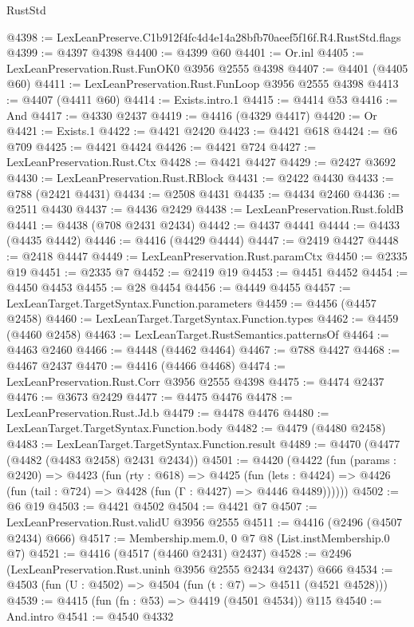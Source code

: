 \begin{lexlean}{RustStd}
\begin{coremodule}
@4398 := LexLeanPreserve.C1b912f4fc4d4e14a28bfb70aeef5f16f.R4.RustStd.flags
@4399 := @4397 @4398
@4400 := @4399 @60
@4401 := Or.inl
@4405 := LexLeanPreservation.Rust.FunOK0 @3956 @2555 @4398
@4407 := @4401 (@4405 @60)
@4411 := LexLeanPreservation.Rust.FunLoop @3956 @2555 @4398
@4413 := @4407 (@4411 @60)
@4414 := Exists.intro.{1}
@4415 := @4414 @53
@4416 := And
@4417 := @4330 @2437
@4419 := @4416 (@4329 @4417)
@4420 := Or
@4421 := Exists.{1}
@4422 := @4421 @2420
@4423 := @4421 @618
@4424 := @6 @709
@4425 := @4421 @4424
@4426 := @4421 @724
@4427 := LexLeanPreservation.Rust.Ctx
@4428 := @4421 @4427
@4429 := @2427 @3692
@4430 := LexLeanPreservation.Rust.RBlock
@4431 := @2422 @4430
@4433 := @788 (@2421 @4431)
@4434 := @2508 @4431
@4435 := @4434 @2460
@4436 := @2511 @4430
@4437 := @4436 @2429
@4438 := LexLeanPreservation.Rust.foldB
@4441 := @4438 (@708 @2431 @2434)
@4442 := @4437 @4441
@4444 := @4433 (@4435 @4442)
@4446 := @4416 (@4429 @4444)
@4447 := @2419 @4427
@4448 := @2418 @4447
@4449 := LexLeanPreservation.Rust.paramCtx
@4450 := @2335 @19
@4451 := @2335 @7
@4452 := @2419 @19
@4453 := @4451 @4452
@4454 := @4450 @4453
@4455 := @28 @4454
@4456 := @4449 @4455
@4457 := LexLeanTarget.TargetSyntax.Function.parameters
@4459 := @4456 (@4457 @2458)
@4460 := LexLeanTarget.TargetSyntax.Function.types
@4462 := @4459 (@4460 @2458)
@4463 := LexLeanTarget.RustSemantics.patternsOf
@4464 := @4463 @2460
@4466 := @4448 (@4462 @4464)
@4467 := @788 @4427
@4468 := @4467 @2437
@4470 := @4416 (@4466 @4468)
@4474 := LexLeanPreservation.Rust.Corr @3956 @2555 @4398
@4475 := @4474 @2437
@4476 := @3673 @2429
@4477 := @4475 @4476
@4478 := LexLeanPreservation.Rust.Jd.b
@4479 := @4478 @4476
@4480 := LexLeanTarget.TargetSyntax.Function.body
@4482 := @4479 (@4480 @2458)
@4483 := LexLeanTarget.TargetSyntax.Function.result
@4489 := @4470 (@4477 (@4482 (@4483 @2458) @2431 @2434))
@4501 := @4420
    (@4422
      (fun (params : @2420) =>
      @4423
        (fun (rty : @618) =>
        @4425
          (fun (lets : @4424) =>
          @4426 (fun (tail : @724) => @4428 (fun (Γ : @4427) => @4446 @4489))))))
@4502 := @6 @19
@4503 := @4421 @4502
@4504 := @4421 @7
@4507 := LexLeanPreservation.Rust.validU @3956 @2555
@4511 := @4416 (@2496 (@4507 @2434) @666)
@4517 := Membership.mem.{0, 0} @7 @8 (List.instMembership.{0} @7)
@4521 := @4416 (@4517 (@4460 @2431) @2437)
@4528 := @2496 (LexLeanPreservation.Rust.uninh @3956 @2555 @2434 @2437) @666
@4534 := @4503 (fun (U : @4502) => @4504 (fun (t : @7) => @4511 (@4521 @4528)))
@4539 := @4415 (fun (fn : @53) => @4419 (@4501 @4534)) @115
@4540 := And.intro
@4541 := @4540 @4332

\end{coremodule}
\end{lexlean}
